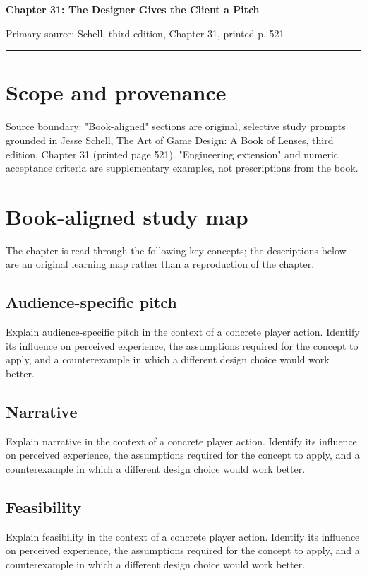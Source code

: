 \documentclass[11pt]{article}
\begin{document}
{\huge\bfseries\color{suiteblue} Chapter 31: The Designer Gives the Client a Pitch}\par
\vspace{0.15in}
{\normalsize\color{suitegray} Primary source: Schell, third edition, Chapter 31, printed p. 521}\par
\vspace{0.15in}\hrule\vspace{0.15in}

\section{Scope and provenance}
Source boundary: "Book-aligned" sections are original, selective study prompts grounded in Jesse Schell, The Art of Game Design: A Book of Lenses, third edition, Chapter 31 (printed page 521). "Engineering extension" and numeric acceptance criteria are supplementary examples, not prescriptions from the book.


\section{Book-aligned study map}
The chapter is read through the following key concepts; the descriptions below are an original learning map rather than a reproduction of the chapter.


\subsection{Audience-specific pitch}
Explain audience-specific pitch in the context of a concrete player action. Identify its influence on perceived experience, the assumptions required for the concept to apply, and a counterexample in which a different design choice would work better.


\subsection{Narrative}
Explain narrative in the context of a concrete player action. Identify its influence on perceived experience, the assumptions required for the concept to apply, and a counterexample in which a different design choice would work better.


\subsection{Feasibility}
Explain feasibility in the context of a concrete player action. Identify its influence on perceived experience, the assumptions required for the concept to apply, and a counterexample in which a different design choice would work better.
\end{document}

